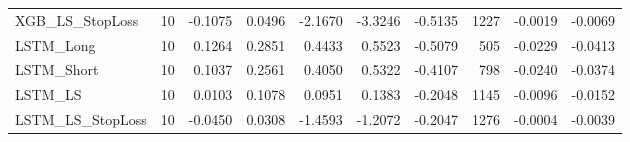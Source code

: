 \begin{tabular}{llrrrrrrrr}
\cline{1-10}
XGB\_LS\_StopLoss & 10 & -0.1075 & 0.0496 & -2.1670 & -3.3246 & -0.5135 & 1227 & -0.0019 & -0.0069 \\
\cline{1-10}
LSTM\_Long & 10 & 0.1264 & 0.2851 & 0.4433 & 0.5523 & -0.5079 & 505 & -0.0229 & -0.0413 \\
\cline{1-10}
LSTM\_Short & 10 & 0.1037 & 0.2561 & 0.4050 & 0.5322 & -0.4107 & 798 & -0.0240 & -0.0374 \\
\cline{1-10}
LSTM\_LS & 10 & 0.0103 & 0.1078 & 0.0951 & 0.1383 & -0.2048 & 1145 & -0.0096 & -0.0152 \\
\cline{1-10}
LSTM\_LS\_StopLoss & 10 & -0.0450 & 0.0308 & -1.4593 & -1.2072 & -0.2047 & 1276 & -0.0004 & -0.0039 \\
\cline{1-10}
\bottomrule
\end{tabular}
